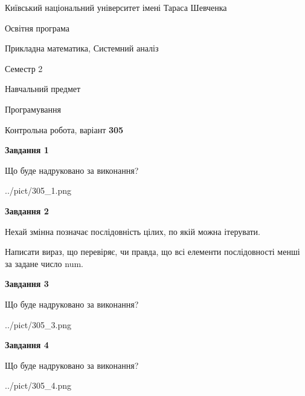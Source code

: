 \documentclass[12pt, ukrainian]{article}
\begin{document}
{{\begin {small}\par
{ \center  Київський національний університет імені Тараса Шевченка \par}
{\parbox {5 cm}{Освітня програма \hfill}{\parbox {8 cm}{Прикладна математика, Системний аналіз \hfill}}\parbox {5 cm}{\hfill Семестр 2}}\par
{\parbox {5 cm} {Навчальний предмет \hfill}\parbox {7 cm}{Програмування \hfill}\parbox {6cm}{\hfill}\par}\vspace{-7pt} \end{small}}{\center Контрольна робота, варіант  \No \textbf
{ 305 }\par}}
{
\begin {large}
{\begin {center}\textbf{Завдання 1}\end {center}}\par
Що буде надруковано за виконання?\par\par
\begin{center}
	{../pict/305_1.png}
\end{center}
\newpage

{\begin {center}\textbf{Завдання 2}\end {center}}\par
Нехай змінна  позначає послідовність цілих, по якій можна ітерувати.

Написати вираз, що перевіряє, чи правда, що всі елементи послідовності менші за задане число num.\par
\newpage

{\begin {center}\textbf{Завдання 3}\end {center}}\par
Що буде надруковано за виконання?\par
\begin{center}
	{../pict/305_3.png}
\end{center}
\newpage

{\begin {center}\textbf{Завдання 4}\end {center}}\par
Що буде надруковано за виконання?\par
\begin{center}
	{../pict/305_4.png}
\end{center}
\newpage


\end{large}}
\end{document}
